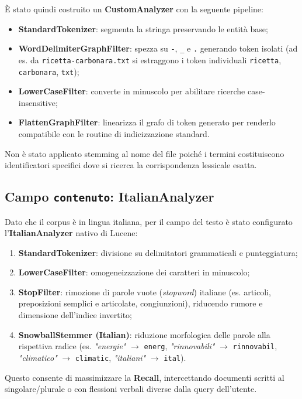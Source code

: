 \documentclass[11pt,a4paper]{article}
\begin{document}
È stato quindi costruito un \textbf{CustomAnalyzer} con la seguente pipeline:
\begin{itemize}
    \item \textbf{StandardTokenizer}: segmenta la stringa preservando le entità base;
    \item \textbf{WordDelimiterGraphFilter}: spezza su \texttt{-}, \texttt{\_} e \texttt{.} generando token isolati (ad es. da \texttt{ricetta-carbonara.txt} si estraggono i token individuali \texttt{ricetta}, \texttt{carbonara}, \texttt{txt});
    \item \textbf{LowerCaseFilter}: converte in minuscolo per abilitare ricerche case-insensitive;
    \item \textbf{FlattenGraphFilter}: linearizza il grafo di token generato per renderlo compatibile con le routine di indicizzazione standard.
\end{itemize}
Non è stato applicato stemming al nome del file poiché i termini costituiscono identificatori specifici dove si ricerca la corrispondenza lessicale esatta.

\subsection{Campo \texttt{contenuto}: ItalianAnalyzer}
Dato che il corpus è in lingua italiana, per il campo del testo è stato configurato l'\textbf{ItalianAnalyzer} nativo di Lucene:
\begin{enumerate}
    \item \textbf{StandardTokenizer}: divisione su delimitatori grammaticali e punteggiatura;
    \item \textbf{LowerCaseFilter}: omogeneizzazione dei caratteri in minuscolo;
    \item \textbf{StopFilter}: rimozione di parole vuote (\textit{stopword}) italiane (es. articoli, preposizioni semplici e articolate, congiunzioni), riducendo rumore e dimensione dell'indice invertito;
    \item \textbf{SnowballStemmer (Italian)}: riduzione morfologica delle parole alla rispettiva radice (es. \textit{"energie"} $\rightarrow$ \texttt{energ}, \textit{"rinnovabili"} $\rightarrow$ \texttt{rinnovabil}, \textit{"climatico"} $\rightarrow$ \texttt{climatic}, \textit{"italiani"} $\rightarrow$ \texttt{ital}).
\end{enumerate}
Questo consente di massimizzare la \textbf{Recall}, intercettando documenti scritti al singolare/plurale o con flessioni verbali diverse dalla query dell'utente.
\end{document}
